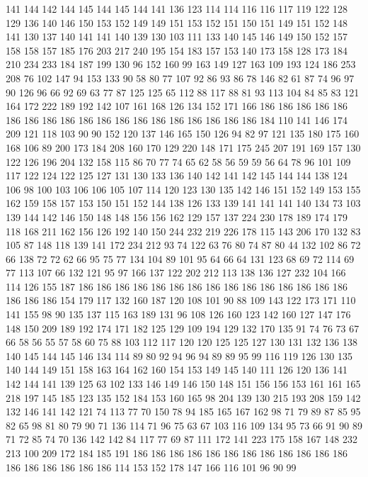141 144 142 144 145 144 145 144 141 136 123 114 114 116 116 117 119 122 128 129
136 140 146 150 153 152 149 149 151 153 152 151 150 151 149 151 152 148 141 130
137 140 141 141 140 139 130 103 111 133 140 145 146 149 150 152 157 158 158 157
185 176 203 217 240 195 154 183 157 153 140 173 158 128 173 184 210 234 233 184
187 199 130 96 152 160 99 163 149 127 163 109 193 124 186 253 208 76 102 147
94 153 133 90 58 80 77 107 92 86 93 86 78 146 82 61 87 74 96 97
90 126 96 66 92 69 63 77 87 125 125 65 112 88 117 88 81 93 113 104
84 85 83 121 164 172 222 189 192 142 107 161 168 126 134 152 171 166 186 186
186 186 186 186 186 186 186 186 186 186 186 186 186 186 186 186 186 184 110 141
146 174 209 121 118 103 90 90 152 120 137 146 165 150 126 94 82 97 121 135
180 175 160 168 106 89 200 173 184 208 160 170 129 220 148 171 175 245 207 191
169 157 130 122 126 196 204 132 158 115 86 70 77 74 65 62 58 56 59 59
56 64 78 96 101 109 117 122 124 122 125 127 131 130 133 136 140 142 141 142
145 144 144 138 124 106 98 100 103 106 106 105 107 114 120 123 130 135 142 146
151 152 149 153 155 162 159 158 157 153 150 151 152 144 138 126 133 139 141 141
141 140 134 73 103 139 144 142 146 150 148 148 156 156 162 129 157 137 224 230
178 189 174 179 118 168 211 162 156 126 192 140 150 244 232 219 226 178 115 143
206 170 132 83 105 87 148 118 139 141 172 234 212 93 74 122 63 76 80 74
87 80 44 132 102 86 72 66 138 72 72 62 66 95 75 77 134 104 89 101
95 64 66 64 131 123 68 69 72 114 69 77 113 107 66 132 121 95 97 166
137 122 202 212 113 138 136 127 232 104 166 114 126 155 187 186 186 186 186 186
186 186 186 186 186 186 186 186 186 186 186 186 186 154 179 117 132 160 187 120
108 101 90 88 109 143 122 173 171 110 141 155 98 90 135 137 115 163 189 131
96 108 126 160 123 142 160 127 147 176 148 150 209 189 192 174 171 182 125 129
109 194 129 132 170 135 91 74 76 73 67 66 58 56 55 57 58 60 75 88
103 112 117 120 120 125 125 127 130 131 132 136 138 140 145 144 145 146 134 114
89 80 92 94 96 94 89 89 95 99 116 119 126 130 135 140 144 149 151 158
163 164 162 160 154 153 149 145 140 111 126 120 136 141 142 144 141 139 125 63
102 133 146 149 146 150 148 151 156 156 153 161 161 165 218 197 145 185 123 135
152 184 153 160 165 98 204 139 130 215 193 208 159 142 132 146 141 142 121 74
113 77 70 150 78 94 185 165 167 162 98 71 79 89 87 85 95 82 65 98
81 80 79 90 71 136 114 71 96 75 63 67 103 116 109 134 95 73 66 91
90 89 71 72 85 74 70 136 142 142 84 117 77 69 87 111 172 141 223 175
158 167 148 232 213 100 209 172 184 185 191 186 186 186 186 186 186 186 186 186
186 186 186 186 186 186 186 186 186 114 153 152 178 147 166 116 101 96 90 99
